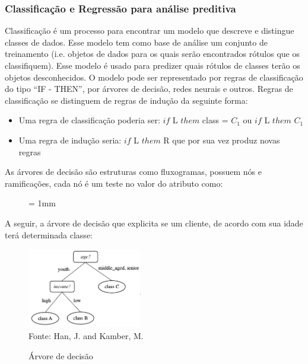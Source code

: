 \documentclass[conference,compsoc]{IEEEtran}
\begin{document}
\subsubsection{Classificação e Regressão para análise preditiva}

Classificação é um processo para encontrar um modelo que descreve e distingue classes de dados. 
Esse modelo tem como base de análise um conjunto de treinamento (i.e. objetos de dados para os quais 
serão encontrados rótulos que os classifiquem). 
Esse modelo é usado para predizer quais rótulos de classes terão os objetos desconhecidos.
O modelo pode ser representado por regras de classificação do tipo ``IF - THEN'', por árvores de decisão, redes neurais e outros. 
Regras de classificação se distinguem de regras de indução da seguinte forma:
\begin{itemize}
 \item Uma regra de classificação poderia ser: $if$ L $them$ class = $C_{1}$ ou $if$ L $them$  $C_{1}$
 \item Uma regra de indução seria: $ if$ L $them$ R que por sua vez produz novas regras 
\end{itemize}

As árvores de decisão são estruturas como fluxogramas, possuem nós e ramificações, 
cada nó é um teste no valor do atributo como:
\singlespace

\begin{figure}[ht] \unitlength= 1mm \thicklines
\end{figure}


\vspace{5mm}
  
A seguir, a árvore de decisão que explicita se um cliente, de acordo com sua idade terá determinada classe:
\begin{figure}[!ht]
\centering
\caption{Árvore de decisão}
\includegraphics[width=50mm, height=35mm]{Figuras/arvorejovem.png}\\
\tiny Fonte: Han, J. and Kamber, M. 
\end{figure}  
\end{document}
